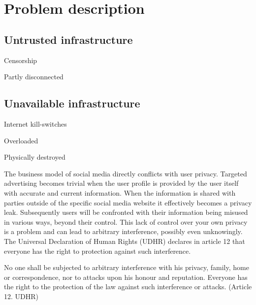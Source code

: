 \chapter{Problem description}









\section{Untrusted infrastructure}

Censorship

Partly disconnected

\section{Unavailable infrastructure}

Internet kill-switches

Overloaded

Physically destroyed


The business model of social media directly conflicts with user privacy.
Targeted advertising becomes trivial when the user profile is provided by the user itself with accurate and current information.
When the information is shared with parties outside of the specific social media website it effectively becomes a privacy leak.
Subsequently users will be confronted with their information being misused in various ways, beyond their control.
This lack of control over your own privacy is a problem and can lead to arbitrary interference, possibly even unknowingly. %
The Universal Declaration of Human Rights (UDHR) declares in article 12 that everyone has the right to protection against such interference.

\begin{displayquote}
	No one shall be subjected to arbitrary interference with his privacy, family, home or correspondence, nor to attacks upon his honour and reputation. Everyone has the right to the protection of the law against such interference or attacks.
	(Article 12. UDHR)
\end{displayquote}

